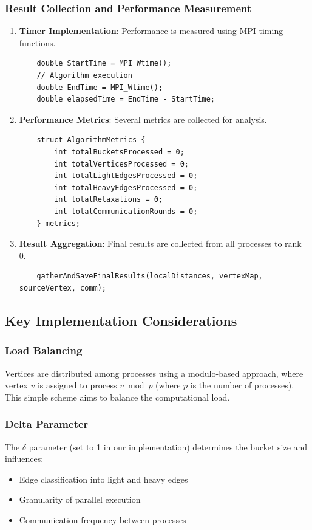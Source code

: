 \documentclass{article}
\begin{document}
\subsubsection*{Result Collection and Performance Measurement}
\begin{enumerate}
    \item \textbf{Timer Implementation}: Performance is measured using MPI timing functions.
    \begin{verbatim}
    double StartTime = MPI_Wtime();
    // Algorithm execution
    double EndTime = MPI_Wtime();
    double elapsedTime = EndTime - StartTime;
    \end{verbatim}
    
    \item \textbf{Performance Metrics}: Several metrics are collected for analysis.
    \begin{verbatim}
    struct AlgorithmMetrics {
        int totalBucketsProcessed = 0;
        int totalVerticesProcessed = 0;
        int totalLightEdgesProcessed = 0;
        int totalHeavyEdgesProcessed = 0;
        int totalRelaxations = 0;
        int totalCommunicationRounds = 0;
    } metrics;
    \end{verbatim}
    
    \item \textbf{Result Aggregation}: Final results are collected from all processes to rank 0.
    \begin{verbatim}
    gatherAndSaveFinalResults(localDistances, vertexMap, sourceVertex, comm);
    \end{verbatim}
\end{enumerate}

\subsection*{Key Implementation Considerations}

\subsubsection*{Load Balancing}
Vertices are distributed among processes using a modulo-based approach, where vertex $v$ is assigned to process $v \bmod p$ (where $p$ is the number of processes). This simple scheme aims to balance the computational load.

\subsubsection*{Delta Parameter}
The $\delta$ parameter (set to 1 in our implementation) determines the bucket size and influences:
\begin{itemize}
    \item Edge classification into light and heavy edges
    \item Granularity of parallel execution
    \item Communication frequency between processes
\end{itemize}
\end{document}
